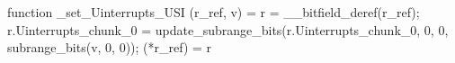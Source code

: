 function _set_Uinterrupts_USI (r_ref, v) = {
    r = __bitfield_deref(r_ref);
    r.Uinterrupts_chunk_0 = update_subrange_bits(r.Uinterrupts_chunk_0, 0, 0, subrange_bits(v, 0, 0));
    (*r_ref) = r
}
